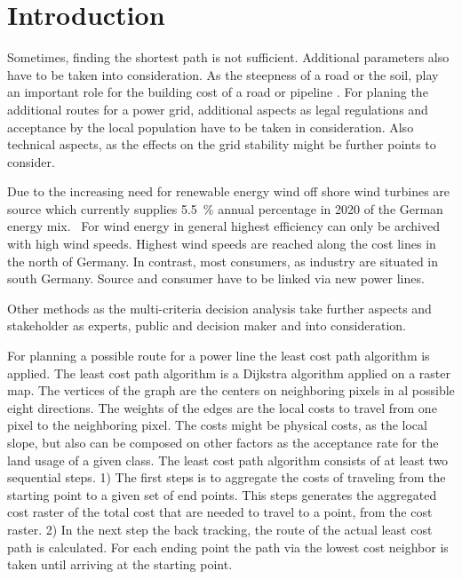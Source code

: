 \documentclass[acmtog]{acmart}
\begin{document}
	\section{Introduction}\label{sec:introduction}

	Sometimes, finding the shortest path is not sufficient.
	Additional parameters also have to be taken into consideration.
	As the steepness of a road or the soil, play an important role for the building cost of a road or pipeline
	\cite{suleiman_optimal_2015}.
	For planing the additional routes for a power grid, additional aspects as legal regulations and acceptance
	by the local population have to be taken in consideration.
	Also technical aspects, as the effects on the grid stability might be further points to consider.\cite{schafer_understanding_2022}
	
	Due to the increasing need for renewable energy wind off shore wind turbines are source which currently supplies 5.5~\% annual percentage in 2020 of the German energy mix.~\cite{noauthor_nettostromerzeugung_2021}
	For wind energy in general highest efficiency can only be archived with high wind speeds. Highest wind speeds are reached along the cost lines in the north of Germany.
	In contrast, most consumers, as industry are situated in south Germany.
	Source and consumer have to be linked via new power lines.

	Other methods as the multi-criteria decision analysis take further aspects and stakeholder as experts, public and decision maker and into consideration.\cite{bertsch_participatory_2016}
	
	For planning a possible route for a power line the least cost path algorithm is applied.
	The least cost path algorithm is a Dijkstra algorithm applied on a raster map.
	The vertices of the graph are the centers on neighboring pixels in al possible eight directions.
	The weights of the edges are the local costs to travel from one pixel to the neighboring pixel.
	The costs might be physical costs, as the local slope, but also can be composed on other factors as the acceptance rate for the land usage of a given class.
	The least cost path algorithm consists of at least two sequential steps. 1) The first steps is to aggregate the costs of traveling from the starting point to a given set of end points. This steps generates the aggregated cost raster of the total cost that are needed to travel to a point, from the cost raster.
	2) In the next step the back tracking, the route of the actual least cost path is calculated. For each ending point the path via the lowest cost neighbor is taken until arriving at the starting point.
	
\end{document}
